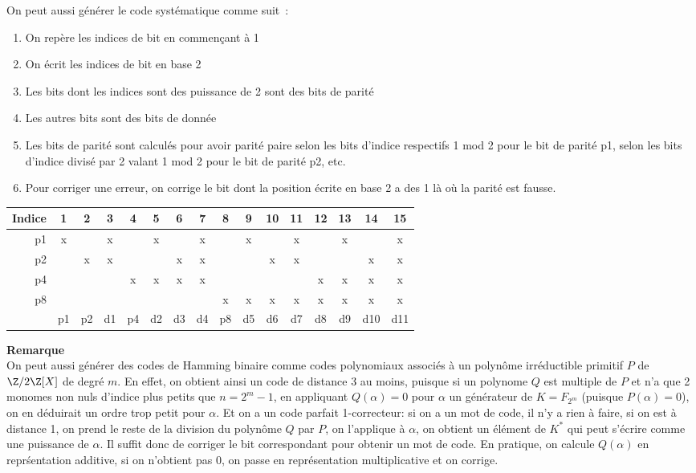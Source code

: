 \documentclass[a4paper,11pt]{book}
\begin{document}
\begin{giacjshere}
On peut aussi g\'en\'erer le code syst\'ematique comme suit~: 
\begin{enumerate}
\item On rep\`ere les indices de bit en commen\c{c}ant
\`a 1
\item On \'ecrit les indices de bit en base 2
\item Les bits dont les indices sont des puissance de 2
sont des bits de parit\'e
\item Les autres bits sont des bits de donn\'ee
\item Les bits de parit\'e sont calcul\'es pour avoir parit\'e
paire selon les bits d'indice respectifs 1 mod 2 pour le bit de
parit\'e p1, selon les bits d'indice divis\'e par 2 valant 1 mod 2 pour le bit de parit\'e p2, etc.
\item Pour corriger une erreur, on corrige le bit dont la position
\'ecrite en base 2 a des 1 l\`a o\`u la parit\'e est fausse.
\end{enumerate}
\begin{tabular}{|r|ccccccccccccccc|} \hline 
Indice & 1 & 2 & 3 & 4 & 5 & 6 & 7 & 8 & 9 & 10 & 11 & 12 & 13 & 14 & 15 \\ \hline
p1     &  x &   & x &   & x  &    & x  &   & x &     &  x   &    & x  &  & x \\
p2     &     & x & x & &     & x  & x &    &    & x  & x    &   &    & x & x \\
p4     &     &    &    & x & x& x& x&      &    &     &       & x& x& x& x \\
p8      &    &    &    &    &    &   &  & x   & x & x  & x   & x & x & x & x \\
\hline 
& p1 & p2 & d1 & p4 & d2 & d3 & d4 & p8 & d5 & d6 & d7 & d8 & d9 & d10 & d11 \\
\hline 
\end{tabular}


{\bf Remarque}\\
On peut aussi g\'en\'erer des codes de Hamming binaire
comme codes polynomiaux associ\'es \`a un polyn\^ome 
irr\'eductible primitif $P$
de $\Z/2\Z[X]$ de degr\'e $m$. En effet, on obtient ainsi un code
de distance 3 au moins, puisque si un polynome $Q$ est multiple de $P$
et n'a que 2 monomes non nuls d'indice plus petits que $n=2^m-1$, 
en appliquant $Q(\alpha)=0$ pour $\alpha$
un g\'en\'erateur de $K=F_{2^m}$ (puisque $P(\alpha)=0$), on
en d\'eduirait un ordre trop petit pour $\alpha$.
Et on a un code parfait 1-correcteur: si on a un mot de code, il n'y a
rien \`a faire, si on est \`a distance 1, on prend le reste de la division
du polyn\^ome $Q$ par $P$, on l'applique \`a $\alpha$, on obtient un
\'el\'ement de $K^*$ qui peut s'\'ecrire comme une puissance
de $\alpha$. Il suffit donc de corriger le bit correspondant
pour obtenir un mot de code.
En pratique, on calcule $Q(\alpha)$ en repr\'sentation additive,
si on n'obtient pas 0,
on passe en repr\'esentation multiplicative et on corrige.


\end{giacjshere}
\end{document}
